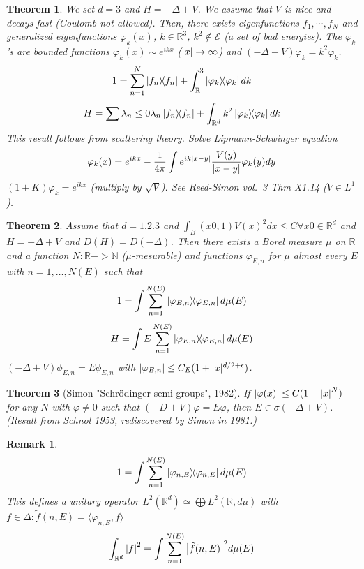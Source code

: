 \documentclass{article}
\newtheorem*{theorem}{Theorem}
\newtheorem*{remark}{Remark}
\newcommand{\RR}{\mathbb{R}}
\newcommand{\NN}{\mathbb{N}}
\newcommand{\cE}{\mathcal{E}}
\newcommand{\la}{\lambda}
\renewcommand{\sp}[2]{\langle #1,#2 \rangle}
\begin{document}
\begin{theorem}
  We set $d = 3$ and $H = - \Delta + V$.
  We assume that $V$ is nice and decays fast (Coulomb not allowed).
  Then, there exists eigenfunctions $f_1,\cdots,f_N$
  and generalized eigenfunctions $\varphi_k(x)$, $k \in \RR^3$, $k^2 \notin \cE$ (a set of bad energies).
  The $\varphi_k$'s are bounded functions $\varphi_k(x) \sim e^{ikx}$ ($\abs{x} \to \infty$)
  and $(-\Delta + V)\varphi_k = k^2 \varphi_k$.
  $$ 1 = \sum_{n=1}^N \dyad{f_n} + \int_\RR^3 \dyad{\varphi_k} dk $$
  $$ H = \sum{\la_n \le 0} \la_n \dyad{f_n} + \int_{\RR^d} k^2 \dyad{\varphi_k} dk $$                                                                                      
  This result follows from scattering theory.
  Solve Lipmann-Schwinger equation
  $$ \varphi_k(x) = e^{ikx} - \frac{1}{4\pi} \int e^{ik\abs{x-y}} \frac{V(y)}{\abs{x-y}} \varphi_k(y) dy $$
  $(1 + K) \varphi_k = e^{ikx}$ (multiply by $\sqrt{V}$).
  See Reed-Simon vol.~3 Thm X1.14 ($V \in L^1$).
\end{theorem}

\begin{theorem}
  Assume that $d = \qty{1,2,3}$ and $\int_B(x0,1) V(x)^2 dx \le C \forall x0 \in \RR^d$ and
  $H = -\Delta + V$ and $D(H) = D(-\Delta)$.
  Then there exists a Borel measure $\mu$ on $\RR$ and a function 
  $N \colon \RR -> \NN$ ($\mu$-mesurable) and functions $\varphi_{E,n}$ for $\mu$ almost every $E$  with $n=1,\ldots,N(E)$ such that 
  $$ 1 = \int \sum_{n=1}^{N(E)} \dyad{\varphi_{E,n}} d\mu(E) $$
  $$ H = \int E \sum_{n=1}^{N(E)}  \dyad{\varphi_{E,n}} d\mu(E) $$
  $(-\Delta+V)\phi_{E,n} = E \phi_{E,n}$ with $\abs{\varphi_{E,n}} \le C_E (1 + |x|^{d/2+\epsilon})$.
\end{theorem}

\begin{theorem}[Simon "Schr\"odinger semi-groups", 1982]
  If $\abs{\varphi(x)} \le C(1+\abs{x}^N)$ for any $N$ with $\varphi \neq 0$ 
  such that $(-D + V) \varphi = E \varphi$, 
  then $E \in \sigma(-\Delta+V)$.
  (Result from Schnol 1953, rediscovered by Simon in 1981.)
\end{theorem}

\begin{remark}
  $$1 = \int \sum_{n=1}^{N(E)} \dyad{\varphi_{n,E}} d\mu(E)$$ 
  This defines a unitary operator $L^2(\RR^d) \simeq \bigoplus L^2(\RR,d\mu)$
  with $f \in \Delta \colon \tilde{f}(n,E) = \sp{\varphi_{n,E}}{f}$
  $$\int_{\RR^d} \abs{f}^2 = \int \sum_{n=1}^{N(E)} \abs{\tilde{f}(n,E)}^2 d\mu(E) $$
\end{remark}
\end{document}
